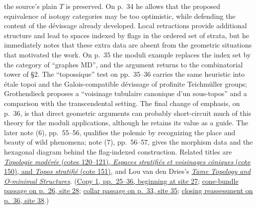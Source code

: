 \documentclass[11pt,a4paper]{article}
\begin{document}
the source's plain $T$ is preserved. On p.~34 he allows that the proposed
equivalence of isotopy categories may be too optimistic, while defending
the content of the dévissage already developed. Local retractions provide
additional structure and lead to spaces indexed by flags in the ordered
set of strata, but he immediately notes that these extra data are absent
from the geometric situations that motivated the work. On p.~35 the
moduli example replaces the index set by the category of ``graphes MD'',
and the argument returns to the combinatorial tower of \S2. The
``topossique'' test on pp.~35--36 carries the same heuristic into étale
topoi and the Galois-compatible dévissage of profinite Teichmüller groups;
Grothendieck proposes a ``voisinage tubulaire canonique d'un sous-topos''
and a comparison with the transcendental setting. The final change of
emphasis, on p.~36, is that direct geometric arguments can probably
short-circuit much of this theory for the moduli applications, although
he retains its value as a guide. The later note (6), pp.~55--56,
qualifies the polemic by recognizing the place and beauty of wild
phenomena; note (7), pp.~56--57, gives the morphism data and the hexagonal
diagram behind the flag-indexed construction. Related titles are
\href{https://grothendieck.umontpellier.fr/archives-grothendieck/}{\emph{Topologie modérée} (cotes 120--121), \emph{Espaces stratifiés et voisinages côniques} (cote 150), and \emph{Topos stratifié} (cote 151)},
and Lou van den Dries's
\href{https://assets.cambridge.org/97805215/98385/frontmatter/9780521598385_frontmatter.pdf}{\emph{Tame Topology and O-minimal Structures}}.
(\href{https://grothendieck.umontpellier.fr/web/viewer.html?file=../119.pdf\#page=28}{Copy 1, pp.~25--36, beginning at site 27};
\href{https://grothendieck.umontpellier.fr/web/viewer.html?file=../119.pdf\#page=29}{cone-bundle passage on p.~26, site 28};
\href{https://grothendieck.umontpellier.fr/web/viewer.html?file=../119.pdf\#page=36}{collar passage on p.~33, site 35};
\href{https://grothendieck.umontpellier.fr/web/viewer.html?file=../119.pdf\#page=39}{closing reassessment on p.~36, site 38}.)
\end{document}
